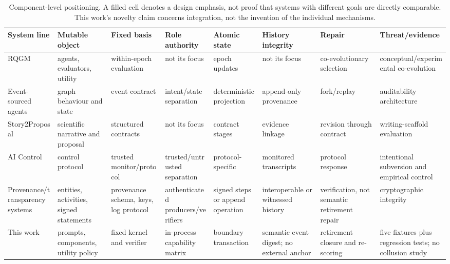 \begin{table}[t]
  \centering
  \scriptsize
  \begin{tabularx}{\textwidth}{@{}p{}*{7}{X}@{}}
    \toprule
    \textbf{System line} & \textbf{Mutable object} & \textbf{Fixed basis} &
    \textbf{Role authority} & \textbf{Atomic state} &
    \textbf{History integrity} & \textbf{Repair} & \textbf{Threat/evidence} \\
    \midrule
    RQGM \cite{iacob2026red} & agents, evaluators, utility &
      within-epoch evaluation & not its focus & epoch updates &
      not its focus & co-evolutionary selection &
      conceptual/experimental co-evolution \\
    Event-sourced agents \cite{nakajima2026the} & graph behaviour and state &
      event contract & intent/state separation & deterministic projection &
      append-only provenance & fork/replay &
      auditability architecture \\
    Story2Proposal \cite{qian2026story2proposal} & scientific narrative and proposal &
      structured contracts & not its focus & contract stages &
      evidence linkage & revision through contract &
      writing-scaffold evaluation \\
    AI Control \cite{greenblatt2023ai} & control protocol &
      trusted monitor/protocol & trusted/untrusted separation &
      protocol-specific & monitored transcripts & protocol response &
      intentional subversion and empirical control \\
    Provenance/transparency systems & entities, activities, signed statements &
      provenance schema, keys, log protocol & authenticated producers/verifiers &
      signed steps or append operation & interoperable or witnessed history &
      verification, not semantic retirement repair & cryptographic integrity \\
    This work & prompts, components, utility policy &
      fixed kernel and verifier & in-process capability matrix &
      boundary transaction & semantic event digest; no external anchor &
      retirement closure and re-scoring &
      five fixtures plus regression tests; no collusion study \\
    \bottomrule
  \end{tabularx}
  \caption{Component-level positioning. A filled cell denotes a design
    emphasis, not proof that systems with different goals are directly
    comparable. This work's novelty claim concerns integration, not the
    invention of the individual mechanisms.}
  \label{tab:related-comparison}
\end{table}

